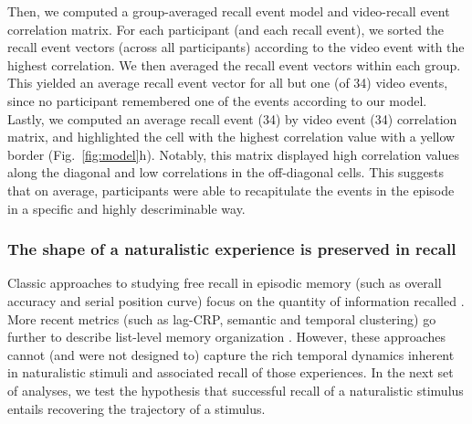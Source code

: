 \documentclass{article}
\begin{document}
Then, we computed a group-averaged recall event model and video-recall event correlation matrix. For each participant (and each recall event), we sorted the recall event vectors (across all participants) according to the video event with the highest correlation. We then averaged the recall event vectors within each group. This yielded an average recall event vector for all but one (of 34) video events, since no participant remembered one of the events according to our model. Lastly, we computed an average recall event (34) by video event (34) correlation matrix, and highlighted the cell with the highest correlation value with a yellow border (Fig.~\ref{fig:model}h). Notably, this matrix displayed high correlation values along the diagonal and low correlations in the off-diagonal cells. This suggests that on average, participants were able to recapitulate the events in the episode in a specific and highly descriminable way.

\subsubsection{The shape of a naturalistic experience is preserved in recall}
Classic approaches to studying free recall in episodic memory (such as overall accuracy and serial position curve) focus on the quantity of information recalled \citep{Murd62a}. More recent metrics (such as lag-CRP, semantic and temporal clustering) go further to describe list-level memory organization \citep{Kaha96, PolyEtal09}. However, these approaches cannot (and were not designed to) capture the rich temporal dynamics inherent in naturalistic stimuli and associated recall of those experiences. In the next set of analyses, we test the hypothesis that successful recall of a naturalistic stimulus entails recovering the trajectory of a stimulus.
\end{document}
